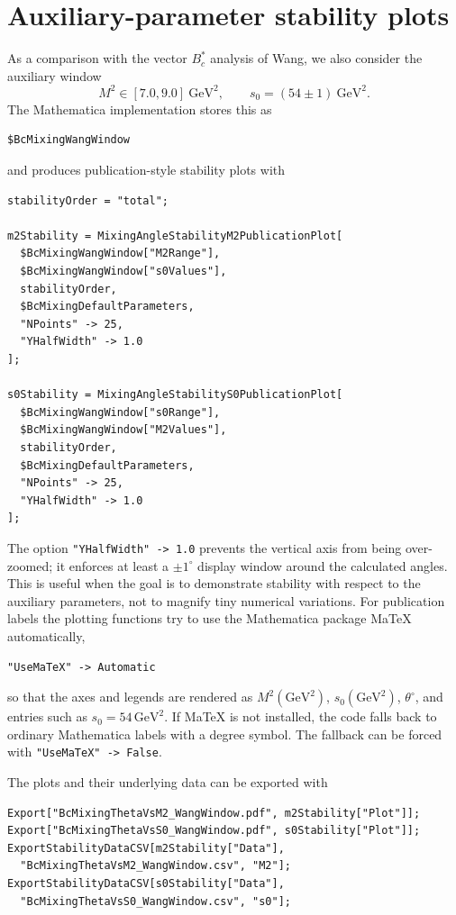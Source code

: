 \documentclass[11pt]{article}
\begin{document}
\section{Auxiliary-parameter stability plots}

As a comparison with the vector \(B_c^*\) analysis of Wang, we also consider
the auxiliary window
\begin{equation}
  M^2\in[7.0,9.0]~\mathrm{GeV}^2,
  \qquad
  s_0=(54\pm1)~\mathrm{GeV}^2.
\end{equation}
The Mathematica implementation stores this as
\begin{verbatim}
$BcMixingWangWindow
\end{verbatim}
and produces publication-style stability plots with
\begin{verbatim}
stabilityOrder = "total";

m2Stability = MixingAngleStabilityM2PublicationPlot[
  $BcMixingWangWindow["M2Range"],
  $BcMixingWangWindow["s0Values"],
  stabilityOrder,
  $BcMixingDefaultParameters,
  "NPoints" -> 25,
  "YHalfWidth" -> 1.0
];

s0Stability = MixingAngleStabilityS0PublicationPlot[
  $BcMixingWangWindow["s0Range"],
  $BcMixingWangWindow["M2Values"],
  stabilityOrder,
  $BcMixingDefaultParameters,
  "NPoints" -> 25,
  "YHalfWidth" -> 1.0
];
\end{verbatim}
The option \texttt{"YHalfWidth" -> 1.0} prevents the vertical axis from being
over-zoomed; it enforces at least a \(\pm1^\circ\) display window around the
calculated angles.  This is useful when the goal is to demonstrate stability
with respect to the auxiliary parameters, not to magnify tiny numerical
variations.
For publication labels the plotting functions try to use the Mathematica
package MaTeX automatically,
\begin{verbatim}
"UseMaTeX" -> Automatic
\end{verbatim}
so that the axes and legends are rendered as \(M^2(\mathrm{GeV}^2)\),
\(s_0(\mathrm{GeV}^2)\), \(\theta^\circ\), and entries such as
\(s_0=54\,\mathrm{GeV}^2\).  If MaTeX is not installed, the code falls back to
ordinary Mathematica labels with a degree symbol.  The fallback can be forced
with \texttt{"UseMaTeX" -> False}.

The plots and their underlying data can be exported with
\begin{verbatim}
Export["BcMixingThetaVsM2_WangWindow.pdf", m2Stability["Plot"]];
Export["BcMixingThetaVsS0_WangWindow.pdf", s0Stability["Plot"]];
ExportStabilityDataCSV[m2Stability["Data"],
  "BcMixingThetaVsM2_WangWindow.csv", "M2"];
ExportStabilityDataCSV[s0Stability["Data"],
  "BcMixingThetaVsS0_WangWindow.csv", "s0"];
\end{verbatim}
\end{document}
